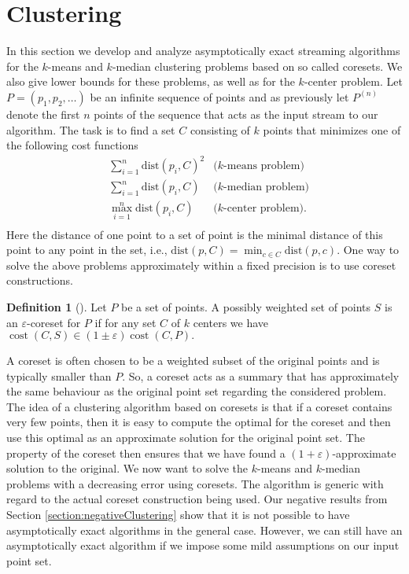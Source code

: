 \documentclass[a4paper,11pt,oneside,english,onecolumn]{article}
\theoremstyle{definition}
\newtheorem{definition}[theorem]{Definition}
\newcommand{\dist}[0]{\ensuremath{\mathrm{dist}}}
\DeclareMathOperator{\cost}{cost}
\newcommand{\eps}{\ensuremath{\varepsilon}}
\begin{document}
\section{Clustering}
\label{section:Clustering}

In this section we develop and analyze asymptotically exact streaming algorithms for the $k$-means and $k$-median clustering problems based on so called coresets. We also give lower bounds for these problems, as well as for the $k$-center problem. Let $P= (p_1, p_2, \ldots)$ be an infinite sequence of points and as previously let $P^{(n)}$ denote the first $n$ points of the sequence that acts as the input stream to our algorithm. The task is to find a set $C$ consisting of $k$ points that minimizes one of the following cost functions
\begin{align*}
&\sum_{i=1}^n \dist(p_i, C)^2 		&\text{($k$-means problem)} \\
&\sum_{i=1}^n \dist(p_i, C) 	&\text{($k$-median problem)} \\
&\max_{i=1}^n \dist(p_i, C) 	&\text{($k$-center problem)}. \\
\end{align*}
Here the distance of one point to a set of point is the minimal distance of this point to any point in the set, i.e., $\dist(p,C)=\min_{c\in C} \dist(p,c).$ One way to solve the above problems approximately within a fixed precision is to use coreset constructions.
\begin{definition}[\cite{HPClustering}]
Let $P$ be a set of points. A possibly weighted set of points $S$ is an $\eps$-coreset for $P$ if for any set $C$ of $k$ centers we have $\cost(C, S) \in (1 \pm \eps) \cost(C, P).$
\end{definition}
A coreset is often chosen to be a weighted subset of the original points and is typically smaller than $P$. So, a coreset acts as a summary that has approximately the same behaviour as the original point set regarding the considered problem.
The idea of a clustering algorithm based on coresets is that if a coreset contains very few points, then it is easy to compute the optimal for the coreset and then use this optimal as an approximate solution for the original point set. The property of the coreset then ensures that we have found a $(1+\eps)$-approximate solution to the original.
We now want to solve the $k$-means and $k$-median problems with a decreasing error using coresets. The algorithm is generic with regard to the actual coreset construction being used. Our negative results from Section \ref{section:negativeClustering} show that it is not possible to have asymptotically exact algorithms in the general case. However, we can still have an asymptotically exact algorithm if we impose some mild assumptions on our input point set.
\end{document}
